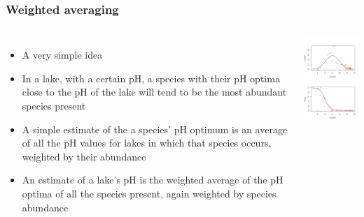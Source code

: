 \documentclass{beamer}
\begin{document}
\begin{frame}
    \frametitle{Weighted averaging}
    \begin{columns}
    \column{7cm}
    \begin{itemize}
        \item A very simple idea
        \item In a lake, with a certain pH, a species with their pH optima close to the pH of the lake will tend to be the most abundant species present
        \item A simple estimate of the a species' pH optimum is an average of all the pH values for lakes in which that species occurs, weighted by their abundance
        \item An estimate of a lake's pH is the weighted average of the pH optima of all the species present, again weighted by species abundance
    \end{itemize}
    
    \column{5cm}
    \includegraphics[width=5cm]{g_pachy_wa}
    \end{columns}
\end{frame}
\end{document}
